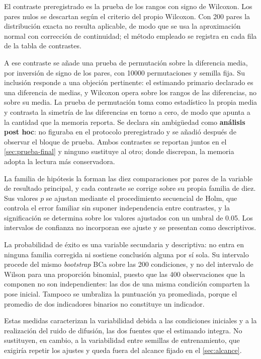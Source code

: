 El contraste preregistrado es la prueba de los rangos con signo de Wilcoxon. Los pares
nulos se descartan seg\'un el criterio del propio Wilcoxon. Con \num{200} pares la
distribuci\'on exacta no resulta aplicable, de modo que se usa la aproximaci\'on normal con
correcci\'on de continuidad; el m\'etodo empleado se registra en cada fila de la tabla de
contrastes.

A ese contraste se a\~nade una prueba de permutaci\'on sobre la diferencia media, por
inversi\'on de signo de los pares, con \num{10000} permutaciones y semilla fija. Su
inclusi\'on responde a una objeci\'on pertinente: el estimando primario declarado es una
diferencia de medias, y Wilcoxon opera sobre los rangos de las diferencias, no sobre su
media. La prueba de permutaci\'on toma como estad\'istico la propia media y contrasta la
simetr\'ia de las diferencias en torno a cero, de modo que apunta a la cantidad que la
memoria reporta. Se declara sin ambig\"uedad como \textbf{an\'alisis post hoc}: no figuraba
en el protocolo preregistrado y se a\~nadi\'o despu\'es de observar el bloque de prueba.
Ambos contrastes se reportan juntos en el \cref{sec:prueba-final} y ninguno sustituye al
otro; donde discrepan, la memoria adopta la lectura m\'as conservadora.

La familia de hip\'otesis la forman las diez comparaciones por pares de la variable de
resultado principal, y cada contraste se corrige sobre su propia familia de diez. Sus
valores $p$ se ajustan mediante el procedimiento secuencial de Holm, que controla el error
familiar sin suponer independencia entre contrastes, y la significaci\'on se determina sobre
los valores ajustados con un umbral de \num{0.05}. Los intervalos de confianza no incorporan
ese ajuste y se presentan como descriptivos.

La probabilidad de \'exito es una variable secundaria y descriptiva: no entra en ninguna
familia corregida ni sostiene conclusi\'on alguna por s\'i sola. Su intervalo procede del
mismo \textit{bootstrap} BCa sobre las \num{200} condiciones, y no del intervalo de Wilson
para una proporci\'on binomial, puesto que las \num{400} observaciones que la componen no
son independientes: las dos de una misma condici\'on comparten la pose inicial. Tampoco se
umbraliza la puntuaci\'on ya promediada, porque el promedio de dos indicadores binarios no
constituye un indicador.

Estas medidas caracterizan la variabilidad debida a las condiciones iniciales y a la
realizaci\'on del ruido de difusi\'on, las dos fuentes que el estimando integra. No
sustituyen, en cambio, a la variabilidad entre semillas de entrenamiento, que exigir\'ia
repetir los ajustes y queda fuera del alcance fijado en el \cref{sec:alcance}.

